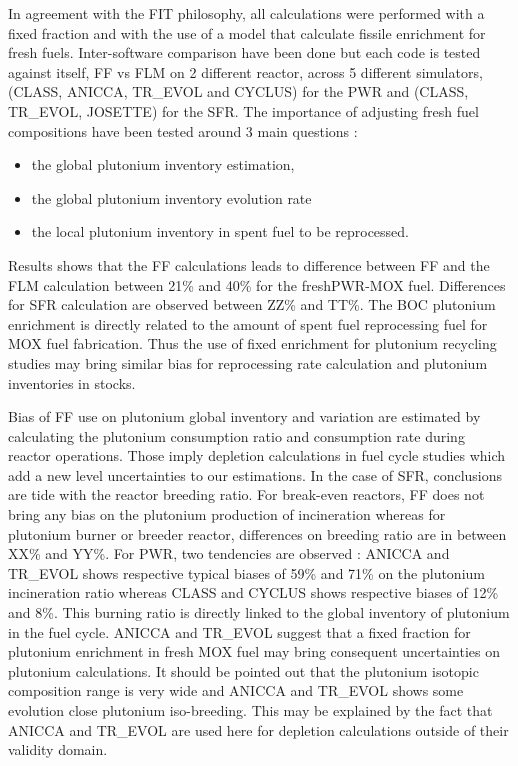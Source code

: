 In agreement with the FIT philosophy, all calculations were performed with a
fixed fraction and with the use of a model that calculate fissile enrichment for
fresh fuels. Inter-software comparison have been done but each code is tested
against itself, \gls{FF} vs \gls{FLM} on 2 different reactor, across 5 different
simulators, (CLASS, ANICCA, TR\_EVOL and CYCLUS) for the \gls{PWR} and (CLASS,
TR\_EVOL, JOSETTE) for the \gls{SFR}. The importance of adjusting fresh fuel
compositions have been tested around 3 main questions : 
\begin{itemize}
    \item the global plutonium inventory estimation,
    \item the global plutonium inventory evolution rate 
    \item the local plutonium inventory in spent fuel to be reprocessed.
\end{itemize}

Results shows that the \gls{FF} calculations leads to difference between
\gls{FF} and the \gls{FLM} calculation between 21\% and 40\% for the
fresh\gls{PWR}-\gls{MOX} fuel. Differences for \gls{SFR} calculation are observed
between ZZ\% and TT\%.  The \gls{BOC} plutonium enrichment is directly related
to the amount of spent fuel reprocessing fuel for MOX fuel fabrication. Thus the
use of fixed enrichment for plutonium recycling studies may bring similar bias
for reprocessing rate calculation and plutonium inventories in stocks. 

Bias of \gls{FF} use on plutonium global inventory and variation are estimated
by calculating the plutonium consumption ratio and consumption rate during
reactor operations. Those imply depletion calculations in fuel cycle studies
which add a new level uncertainties to our estimations. In the case of
\gls{SFR}, conclusions are tide with the reactor breeding ratio. For break-even
reactors, \gls{FF} does not bring any bias on the plutonium production of
incineration whereas for plutonium burner or breeder reactor, differences on
breeding ratio are in between XX\% and YY\%. For PWR, two tendencies are
observed : ANICCA and TR\_EVOL shows respective typical biases of 59\% and 71\%
on the plutonium incineration ratio whereas CLASS and CYCLUS shows respective
biases of 12\% and 8\%. This burning ratio is directly linked to the global
inventory of plutonium in the fuel cycle. ANICCA and TR\_EVOL suggest that a
fixed fraction for plutonium enrichment in fresh MOX fuel may bring consequent
uncertainties on plutonium calculations. It should be pointed out that the
plutonium isotopic composition range is very wide and ANICCA and TR\_EVOL shows
some evolution close plutonium iso-breeding. This may be explained by the fact
that ANICCA and TR\_EVOL are used here for depletion calculations outside of
their validity domain.        

